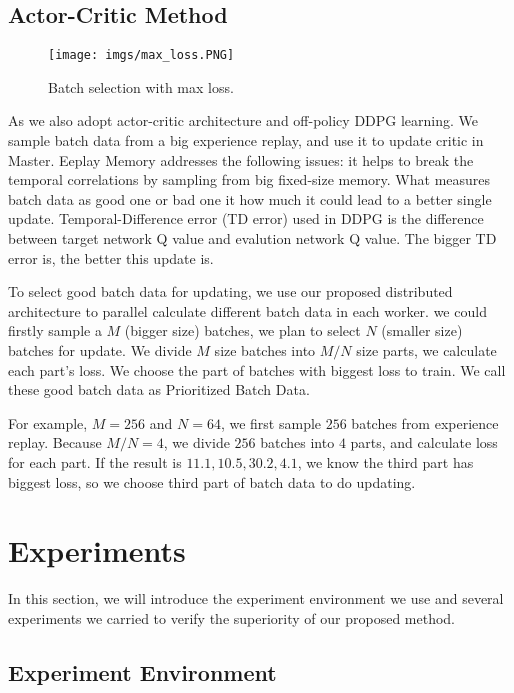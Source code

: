 \documentclass[11pt,twocolumn]{jarticle} %
\begin{document}
\subsection{Actor-Critic Method}
\begin{figure}[h]
 \begin{center}
  \texttt{[image: imgs/max\_loss.PNG]}
  \caption{
  Batch selection with max loss.
  }
  \label{fig:max_loss}
 \end{center}
\end{figure}
As we also adopt actor-critic architecture and off-policy DDPG learning. We sample batch data from a big experience replay, and use it to update critic in Master. 
Eeplay Memory addresses the following issues: it helps to break the temporal correlations by sampling from big fixed-size memory. What measures batch data as good one or bad one it how much it could lead to a better single update. Temporal-Difference error (TD error) used in DDPG is the difference between target network Q value and evalution network Q value. The bigger TD error is, the better this update is. \par

To select good batch data for updating, we use our proposed distributed architecture to parallel calculate different batch data in each worker. we could firstly sample a $M$ (bigger size) batches, we plan to select $N$ (smaller size) batches for update. We divide $M$ size batches into $M/N$ size parts, we calculate each part's loss. We choose the part of batches with biggest loss to train. We call these good batch data as Prioritized Batch Data. \par

For example, $M = 256$ and $N = 64$, we first sample $256$ batches from experience replay. Because $M / N = 4$, we divide $256$ batches into $4$ parts, and calculate loss for each part. If the result is {$11.1, 10.5, 30.2, 4.1$}, we know the third part has biggest loss, so we choose third part of batch data to do updating. 

\section{Experiments}
In this section, we will introduce the experiment environment we use and several experiments we carried to verify the superiority of our proposed method.

\subsection{Experiment Environment}
\end{document}
